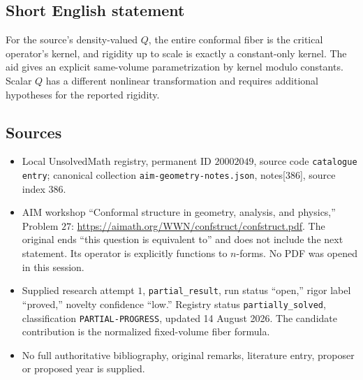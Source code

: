 \documentclass[11pt]{article}
\begin{document}
\subsection{Short English statement}
For the source's density-valued \(Q\), the entire conformal fiber is the critical operator's kernel, and rigidity up to scale is exactly a constant-only kernel. The aid gives an explicit same-volume parametrization by kernel modulo constants. Scalar \(Q\) has a different nonlinear transformation and requires additional hypotheses for the reported rigidity.
\subsection{Sources}
\begin{itemize}
\item Local UnsolvedMath registry, permanent ID \(20002049\), source code \texttt{catalogue entry}; canonical collection \texttt{aim-geometry-notes.json}, notes[386], source index \(386\).
\item AIM workshop ``Conformal structure in geometry, analysis, and physics,'' Problem \(27\): \url{https://aimath.org/WWN/confstruct/confstruct.pdf}. The original ends ``this question is equivalent to'' and does not include the next statement. Its operator is explicitly functions to \(n\)-forms. No PDF was opened in this session.
\item Supplied research attempt \(1\), \texttt{partial\_result}, run status ``open,'' rigor label ``proved,'' novelty confidence ``low.'' Registry status \texttt{partially\_solved}, classification \texttt{PARTIAL-PROGRESS}, updated 14 August 2026. The candidate contribution is the normalized fixed-volume fiber formula.
\item No full authoritative bibliography, original remarks, literature entry, proposer or proposed year is supplied.
\end{itemize}
\end{document}
